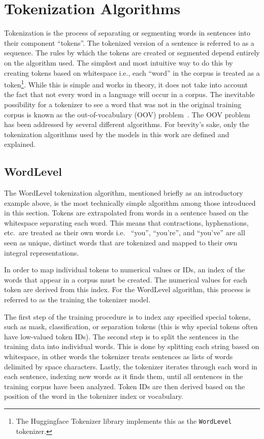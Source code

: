 \documentclass[12pt]{article}
\begin{document}
\section{Tokenization Algorithms}\label{sec:tokenizers}
Tokenization is the process of separating or segmenting words in sentences into their component ``tokens''. The tokenized version of a sentence is
referred to as a sequence. The rules by which the tokens are created or segmented depend entirely on the algorithm used. The simplest and most
intuitive way to do this by creating tokens based on whitespace i.e., each ``word'' in the corpus is  treated as a token\footnote{The Huggingface
    Tokenizer library implements this as the \lstinline|WordLevel| tokenizer.}. While this is simple and works in theory, it does not take into
account the fact that not every word in a language will occur in a corpus. The inevitable possibility for a tokenizer to see a word that was not in
the original training corpus is known as the out-of-vocabulary (OOV) problem~\cite{wu_googles_2016}. The OOV problem has been addressed by several
different algorithms. For brevity's sake, only the tokenization algorithms used by the models in this work are defined and explained.

\subsection{WordLevel}\label{sec:wordlevel}
The WordLevel tokenization algorithm, mentioned briefly as an introductory example above, is the most technically simple algorithm among those
introduced in this section. Tokens are extrapolated from words in a sentence based on the whitespace separating each word. This means that
contractions, hyphenations, etc.~are treated as their own words i.e.~ ``you'', ``you're'', and ``you've'' are all seen as unique, distinct words that
are tokenized and mapped to their own integral representations.

In order to map individual tokens to numerical values or IDs, an index of the words that appear in a corpus must be created. The numerical values for
each token are derived from this index. For the WordLevel algorithm, this process is referred to as the training the tokenizer model.

The first step of the training procedure is to index any specified special tokens, such as mask, classification, or separation tokens (this is why
special tokens often have low-valued token IDs). The second step is to split the sentences in the training data into individual words. This is done
by splitting each string based on whitespace, in other words the tokenizer treats sentences as lists of words delimited by space characters. Lastly,
the tokenizer iterates through each word in each sentence, indexing new words as it finds them, until all sentences in the training corpus have been
analyzed. Token IDs are then derived based on the position of the word in the tokenizer index or vocabulary.
\end{document}
